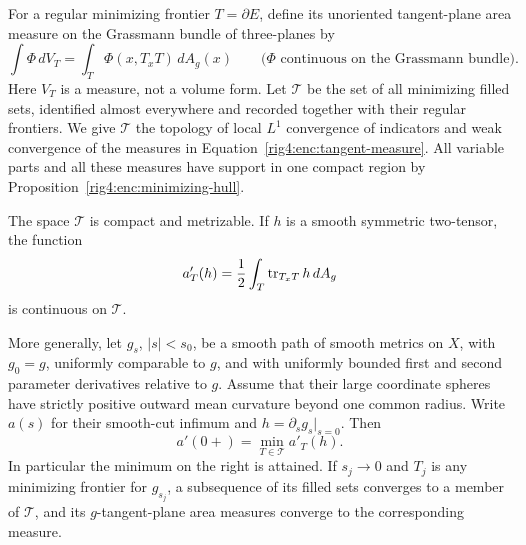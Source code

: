 For a regular minimizing frontier $T=\partial E$, define its
unoriented tangent-plane area measure on the Grassmann bundle of
three-planes by
\begin{equation}
 \int\Phi\,dV_T
   =\int_T\Phi(x,T_xT)\,dA_g(x)
 \qquad
 \bigl(\Phi\text{ continuous on the Grassmann bundle}\bigr).
 \label{rig4:enc:tangent-measure}
\end{equation}
Here $V_T$ is a measure, not a volume form. Let $\mathcal T$ be the set
of all minimizing filled sets, identified almost everywhere and
recorded together with their regular frontiers. We give $\mathcal T$
the topology of local $L^1$ convergence of indicators and weak
convergence of the measures in Equation~\eqref{rig4:enc:tangent-measure}.
All variable parts and all these measures have support in one compact
region by Proposition~\ref{rig4:enc:minimizing-hull}.

\begin{proposition}
\label{rig4:enc:area-derivative}
The space $\mathcal T$ is compact and metrizable. If $h$ is a smooth
symmetric two-tensor, the function
\begin{equation}
 a'_T(h)=\frac12\int_T\operatorname{tr}_{T_xT}h\,dA_g
 \label{rig4:enc:metric-area-functional}
\end{equation}
is continuous on $\mathcal T$.

More generally, let $g_s$, $|s|<s_0$, be a smooth path of smooth metrics
on $X$, with $g_0=g$, uniformly comparable to $g$, and with uniformly
bounded first and second parameter derivatives relative to $g$.
Assume that their large coordinate spheres have strictly positive
outward mean curvature beyond one common radius. Write $a(s)$ for
their smooth-cut infimum and $h=\partial_sg_s|_{s=0}$. Then
\begin{equation}
 a'(0+)=\min_{T\in\mathcal T}a'_T(h).
 \label{rig4:enc:area-derivative-formula}
\end{equation}
In particular the minimum on the right is attained. If $s_j\to0$ and
$T_j$ is any minimizing frontier for $g_{s_j}$, a subsequence of its
filled sets converges to a member of $\mathcal T$, and its
$g$-tangent-plane area measures converge to the corresponding measure.
\end{proposition}

